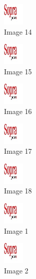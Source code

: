 \begin{figure}[!h]
  \center
  \includegraphics[width=1cm]{img/test.jpg}
  \caption{Image 14}
\end{figure}

\begin{figure}[!h]
  \center
  \includegraphics[width=1cm]{img/test.jpg}
  \caption{Image 15}
\end{figure}

\begin{figure}[!h]
  \center
  \includegraphics[width=1cm]{img/test.jpg}
  \caption{Image 16}
\end{figure}

\begin{figure}[!h]
  \center
  \includegraphics[width=1cm]{img/test.jpg}
  \caption{Image 17}
\end{figure}

\begin{figure}[h]
  \center
  \includegraphics[width=1cm]{img/test.jpg}
  \caption{Image 18}
\end{figure}

\clearpage

\begin{figure}[!h]
  \center
  \includegraphics[width=1cm]{img/test.jpg}
  \caption{Image 1}
\end{figure}

\begin{figure}[!h]
  \center
  \includegraphics[width=1cm]{img/test.jpg}
  \caption{Image 2}
\end{figure}

